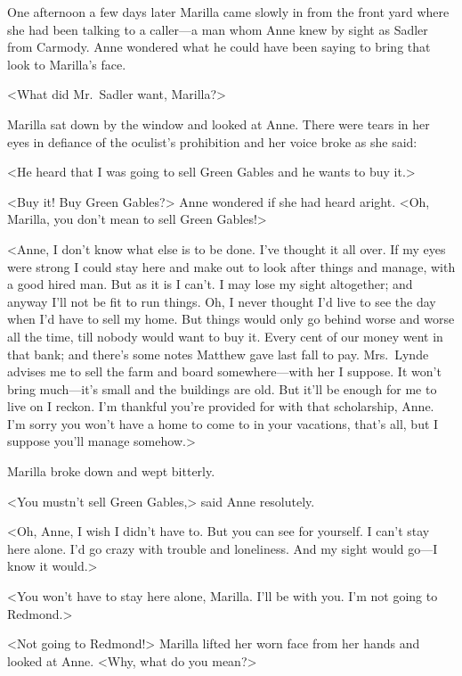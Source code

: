 One afternoon a few days later Marilla came slowly in from the front yard where she had been talking to a caller—a man whom Anne knew by sight as Sadler from Carmody. Anne wondered what he could have been saying to bring that look to Marilla's face.

<What did Mr.~Sadler want, Marilla?>

Marilla sat down by the window and looked at Anne. There were tears in her eyes in defiance of the oculist's prohibition and her voice broke as she said:

<He heard that I was going to sell Green Gables and he wants to buy it.>

<Buy it! Buy Green Gables?> Anne wondered if she had heard aright. <Oh, Marilla, you don't mean to sell Green Gables!>

<Anne, I don't know what else is to be done. I've thought it all over. If my eyes were strong I could stay here and make out to look after things and manage, with a good hired man. But as it is I can't. I may lose my sight altogether; and anyway I'll not be fit to run things. Oh, I never thought I'd live to see the day when I'd have to sell my home. But things would only go behind worse and worse all the time, till nobody would want to buy it. Every cent of our money went in that bank; and there's some notes Matthew gave last fall to pay. Mrs.~Lynde advises me to sell the farm and board somewhere—with her I suppose. It won't bring much—it's small and the buildings are old. But it'll be enough for me to live on I reckon. I'm thankful you're provided for with that scholarship, Anne. I'm sorry you won't have a home to come to in your vacations, that's all, but I suppose you'll manage somehow.>

Marilla broke down and wept bitterly.

<You mustn't sell Green Gables,> said Anne resolutely.

<Oh, Anne, I wish I didn't have to. But you can see for yourself. I can't stay here alone. I'd go crazy with trouble and loneliness. And my sight would go—I know it would.>

<You won't have to stay here alone, Marilla. I'll be with you. I'm not going to Redmond.>

<Not going to Redmond!> Marilla lifted her worn face from her hands and looked at Anne. <Why, what do you mean?>

